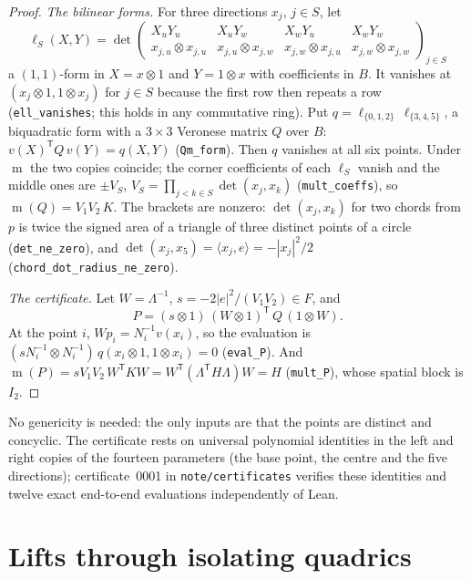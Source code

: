 \documentclass[11pt]{article}
\theoremstyle{definition}
\theoremstyle{remark}
\newcommand{\B}{B}
\DeclareMathOperator{\m}{m}
\begin{document}
\begin{proof}
\emph{The bilinear forms.} For three directions $x_j$, $j \in S$, let
\[
\ell_S(X, Y) = \det
\begin{pmatrix}
X_u Y_u & X_u Y_w & X_w Y_u & X_w Y_w \\
x_{j,u} \otimes x_{j,u} & x_{j,u} \otimes x_{j,w} & x_{j,w} \otimes x_{j,u} & x_{j,w} \otimes x_{j,w}
\end{pmatrix}_{j \in S}
\]
a $(1,1)$-form in $X = x \otimes 1$ and $Y = 1 \otimes x$ with coefficients in $\B$. It vanishes at
$(x_j \otimes 1, 1 \otimes x_j)$ for $j \in S$ because the first row then repeats a row
(\texttt{ell\_vanishes}; this holds in any commutative ring). Put
$q = \ell_{\{0,1,2\}} \, \ell_{\{3,4,5\}}$, a biquadratic form with a $3 \times 3$ Veronese matrix $Q$
over $\B$: $v(X)^{\mathsf T} Q\, v(Y) = q(X,Y)$ (\texttt{Qm\_form}). Then $q$ vanishes at all six points.
Under $\m$ the two copies coincide; the corner coefficients of each $\ell_S$ vanish and the middle
ones are $\pm V_S$, $V_S = \prod_{j<k \in S} \det(x_j, x_k)$ (\texttt{mult\_coeffs}), so
$\m(Q) = V_1 V_2\, K$. The brackets are nonzero: $\det(x_j, x_k)$ for two chords from $p$ is twice the
signed area of a triangle of three distinct points of a circle (\texttt{det\_ne\_zero}), and
$\det(x_j, x_5) = \langle x_j, e\rangle = -|x_j|^2/2$ (\texttt{chord\_dot\_radius\_ne\_zero}).

\emph{The certificate.} Let $W = \Lambda^{-1}$, $s = -2|e|^2/(V_1 V_2) \in F$, and
\[
P = (s \otimes 1)\, (W \otimes 1)^{\mathsf T}\, Q\, (1 \otimes W) .
\]
At the point $i$, $W p_i = N_i^{-1} v(x_i)$, so the evaluation is
$(s N_i^{-1} \otimes N_i^{-1})\, q(x_i \otimes 1, 1 \otimes x_i) = 0$ (\texttt{eval\_P}). And
$\m(P) = s V_1 V_2\, W^{\mathsf T} K W = W^{\mathsf T} (\Lambda^{\mathsf T} H \Lambda) W = H$
(\texttt{mult\_P}), whose spatial block is $I_2$.
\end{proof}

No genericity is needed: the only inputs are that the points are distinct and concyclic. The
certificate rests on universal polynomial identities in the left and right copies of the fourteen
parameters (the base point, the centre and the five directions); certificate~0001 in
\texttt{note/certificates} verifies these identities and twelve exact end-to-end evaluations
independently of Lean.

\section{Lifts through isolating quadrics}\label{sec:lift}
\end{document}

